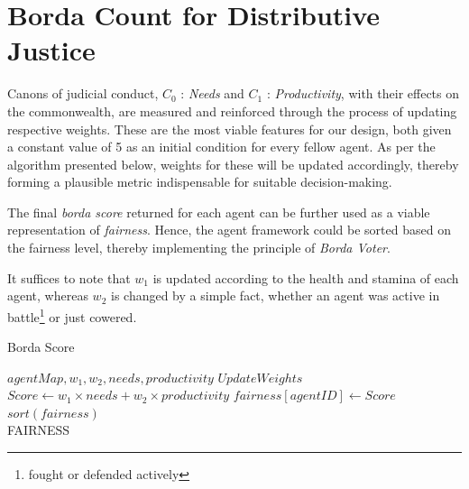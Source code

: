 \clearpage

\section{Borda Count for Distributive Justice }

Canons of judicial conduct, $C_0$ : \textit{Needs} and $C_1$ : \textit{Productivity}, with their effects on the commonwealth, are measured and reinforced through the process of updating respective weights. These are the most viable features for our design, both given a constant value of 5 as an initial condition for every fellow agent. As per the algorithm presented below, weights for these will be updated accordingly, thereby forming a plausible metric indispensable for suitable decision-making.

The final \textit{borda score} returned for each agent can be further used as a viable representation of \textit{fairness}. Hence, the agent framework could be sorted based on the fairness level, thereby implementing the principle of \textit{Borda Voter}.

It suffices to note that $w_1$ is updated according to the health and stamina of each agent, whereas $w_2$ is changed by a simple fact, whether an agent was active in battle\footnote{fought or defended actively} or just cowered.



\begin{algorithm}
\caption{Borda Score}\label{alg:5}
\begin{algorithmic} 
\scriptsize
\Require $agentMap, w_1, w_2, needs, productivity$
\State $Update Weights$
\State $Score \leftarrow w_1 \times needs + w_2 \times productivity$
\State $fairness[agentID] \leftarrow Score$
\EndWhile
\State $sort(fairness)$\\
\Return FAIRNESS
\end{algorithmic}
\end{algorithm}


